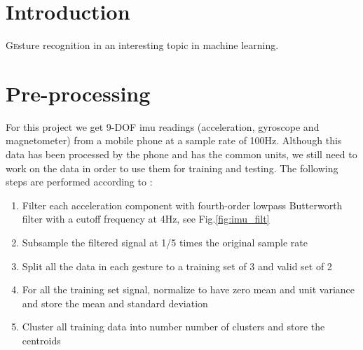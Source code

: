 \documentclass[twoside]{article}
\begin{document}
\begin{multicols}{2} %

\section{Introduction}
\lettrine[nindent=0em,lines=2]{G}esture recognition in an interesting topic in machine learning.


\section{Pre-processing}

For this project we get 9-DOF imu readings (acceleration, gyroscope and magnetometer) from a mobile phone at a sample rate of 100Hz. Although this data has been processed by the phone and has the common units, we still need to work on the data in order to use them for training and testing. The following steps are performed according to \cite{Vesa00}:

\begin{enumerate}
	\item Filter each acceleration component with fourth-order lowpass Butterworth filter with a cutoff frequency at 4Hz, see Fig.\ref{fig:imu_filt}
	\item Subsample the filtered signal at 1/5 times the original sample rate
	\item Split all the data in each gesture to a training set of 3 and valid set of 2
	\item For all the training set signal, normalize to have zero mean and unit variance and store the mean and standard deviation
	\item Cluster all training data into number number of clusters and store the centroids
\end{enumerate}


\end{multicols}
\end{document}
